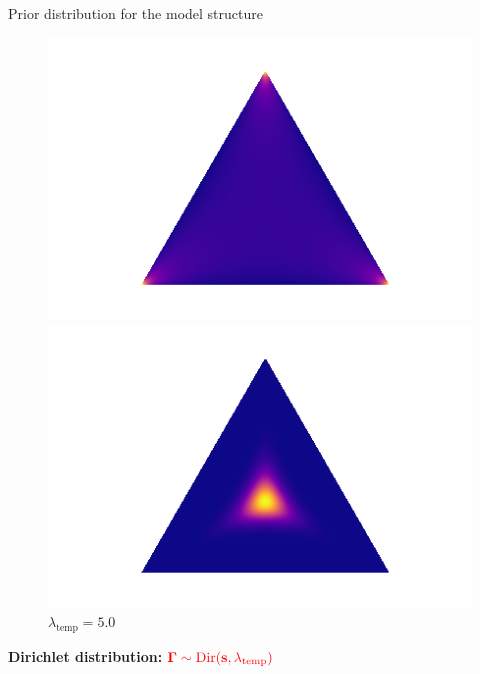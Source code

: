 \documentclass[usenames,dvipsnames,11pt,pdf,utf8,russian,aspectratio=169]{beamer}
\begin{document}
\begin{frame}{Prior distribution for the model structure}
\begin{figure}
\begin{minipage}[t]{.2\textwidth}
\begin{tikzpicture}[%
x={(1.7cm,0cm)},
y={(0cm,1.7cm)},
]
\end{tikzpicture}
\caption*{$\lambda_\text{temp}\to0$}
\end{minipage}
\hfill
 \begin{minipage}[t]{.2\textwidth}
   \includegraphics[width=\textwidth]{gs0995.png}
\caption*{$\lambda_\text{temp}=0.995$}
\end{minipage}
\hfill
 \begin{minipage}[t]{.2\textwidth}
   \includegraphics[width=\textwidth]{gs5.png}
\caption*{$\lambda_\text{temp}=5.0$}
\end{minipage}

\end{figure}

\textbf{Dirichlet distribution: }$\textcolor{red}{\boldsymbol{\Gamma}\sim \text{Dir}(\mathbf{s}, \lambda_\text{temp})}$\\
\begin{figure}
 \begin{minipage}[t]{.2\textwidth}
        \centering
\begin{tikzpicture}[%
x={(1.7cm,0cm)},
y={(0cm,1.7cm)},
]


\end{tikzpicture}
\end{minipage}
\end{figure}
\end{frame}
\end{document}
